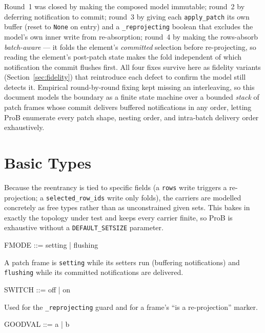 \documentclass[a4paper,10pt,fleqn]{article}
\begin{document}
Round~1 was closed by making the composed model immutable; round~2 by deferring
notification to commit; round~3 by giving each \texttt{apply\_patch} its own
buffer (reset to \texttt{None} on entry) and a \texttt{\_reprojecting} boolean
that excludes the model's own inner write from re-absorption; round~4 by making
the rows-absorb \emph{batch-aware} --- it folds the element's \emph{committed}
selection before re-projecting, so reading the element's post-patch state makes
the fold independent of which notification the commit flushes first.  All four
fixes survive here as fidelity variants (Section~\ref{sec:fidelity}) that
reintroduce each defect to confirm the model still detects it.  Empirical
round-by-round fixing kept missing an interleaving, so this document models the
boundary as a finite state machine over a bounded \emph{stack} of patch frames
whose commit delivers buffered notifications in any order, letting ProB
enumerate every patch shape, nesting order, and intra-batch delivery order
exhaustively.

\section{Basic Types}

Because the reentrancy is tied to specific fields (a \texttt{rows} write triggers
a re-projection; a \texttt{selected\_row\_ids} write only folds), the carriers
are modelled concretely as free types rather than as unconstrained given sets.
This bakes in exactly the topology under test and keeps every carrier finite, so
ProB is exhaustive without a \texttt{DEFAULT\_SETSIZE} parameter.

\begin{zed}
  FMODE ::= setting | flushing
\end{zed}

A patch frame is \texttt{setting} while its setters run (buffering notifications)
and \texttt{flushing} while its committed notifications are delivered.

\begin{zed}
  SWITCH ::= off | on
\end{zed}

Used for the \texttt{\_reprojecting} guard and for a frame's ``is a
re-projection'' marker.

\begin{zed}
  GOODVAL ::= a | b
\end{zed}
\end{document}
